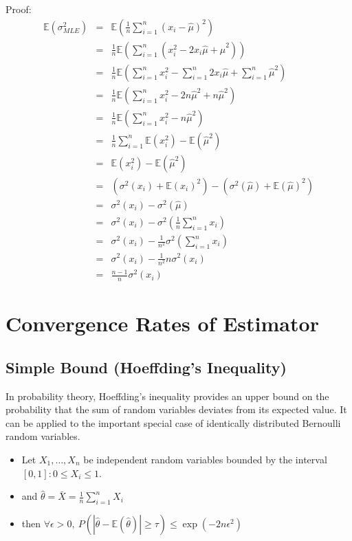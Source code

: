 \documentclass[letterpaper,10pt]{article}
\begin{document}
Proof:
\begin{equation}
\begin{array}{rcl}
\mathbb{E}(\sigma^2_{MLE}) & = & \mathbb{E}(\frac{1}{n}\sum_{i=1}^{n}{(x_i-\hat{\mu})^2}) \\
						   & = & \frac{1}{n}\mathbb{E}(\sum_{i=1}^{n}{(x_i^2-2x_i\hat{\mu}+\hat{\mu}^2)}) \\
   						   & = & \frac{1}{n}\mathbb{E}(\sum_{i=1}^{n}{x_i^2}-\sum_{i=1}^{n}{2x_i\hat{\mu}}+\sum_{i=1}^{n}{\hat{\mu}^2}) \\
   						   & = & \frac{1}{n}\mathbb{E}(\sum_{i=1}^{n}{x_i^2}-2n\hat{\mu}^2+n\hat{\mu}^2) \\
   						   & = & \frac{1}{n}\mathbb{E}(\sum_{i=1}^{n}{x_i^2}-n\hat{\mu}^2) \\
   						   & = & \frac{1}{n}\sum_{i=1}^{n}{\mathbb{E}(x_i^2)-\mathbb{E}(\hat{\mu}^2)}\\
						   & = & \mathbb{E}(x_i^2)-\mathbb{E}(\hat{\mu}^2) \\
						   & = & (\sigma^2(x_i)+\mathbb{E}(x_i)^2)-(\sigma^2(\hat{\mu})+\mathbb{E}(\hat{\mu})^2) \\
						   & = & \sigma^2(x_i) - \sigma^2(\hat{\mu}) \\
						   & = & \sigma^2(x_i) - \sigma^2(\frac{1}{n}\sum_{i=1}^{n}{x_i}) \\
						   & = & \sigma^2(x_i) - \frac{1}{n^2}\sigma^2(\sum_{i=1}^{n}{x_i}) \\
						   & = & \sigma^2(x_i) - \frac{1}{n^2}n\sigma^2(x_i) \\
						   & = & \frac{n-1}{n}\sigma^2(x_i)
\end{array}
\end{equation}

\section{Convergence Rates of Estimator}

\subsection{Simple Bound (Hoeffding's Inequality)}

In probability theory, Hoeffding's inequality provides an upper bound on the probability that the sum of random variables deviates from its expected value. It can be applied to the important special case of identically distributed Bernoulli random variables.
\begin{itemize}
	\item Let $X_1,\dots,X_n$ be independent random variables bounded by the interval $[0,1]:0\leq X_i \leq 1$.
	\item and $\hat{\theta}=\bar{X}=\frac{1}{n}\sum_{i=1}^{n}{X_i}$
	\item then $\forall \epsilon>0,~P(|\hat{\theta}-\mathbb{E}(\hat{\theta})| \geq \tau) \leq \exp(-2n\epsilon^2)$
\end{itemize}
\end{document}
